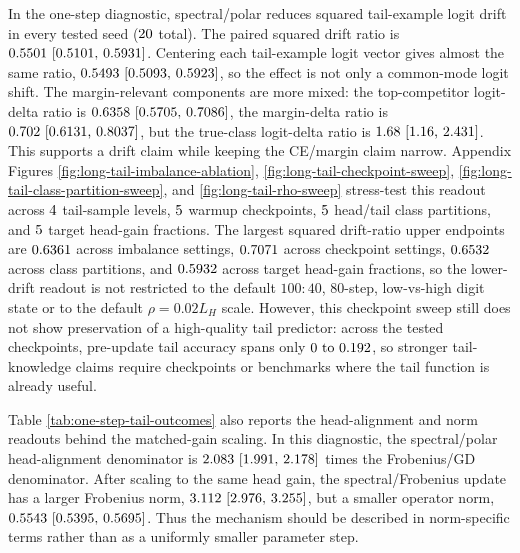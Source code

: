 \documentclass{article}
\theoremstyle{definition}
\begin{document}
In the one-step diagnostic, spectral/polar reduces squared tail-example logit drift in every tested seed (\(20\) total). The paired squared drift ratio is \(0.5501 ~\text{[0.5101,\hspace{0.35em}0.5931]}\). Centering each tail-example logit vector gives almost the same ratio, \(0.5493 ~\text{[0.5093,\hspace{0.35em}0.5923]}\), so the effect is not only a common-mode logit shift. The margin-relevant components are more mixed: the top-competitor logit-delta ratio is \(0.6358 ~\text{[0.5705,\hspace{0.35em}0.7086]}\), the margin-delta ratio is \(0.702 ~\text{[0.6131,\hspace{0.35em}0.8037]}\), but the true-class logit-delta ratio is \(1.68 ~\text{[1.16,\hspace{0.35em}2.431]}\). This supports a drift claim while keeping the CE/margin claim narrow. Appendix Figures \ref{fig:long-tail-imbalance-ablation}, \ref{fig:long-tail-checkpoint-sweep}, \ref{fig:long-tail-class-partition-sweep}, and \ref{fig:long-tail-rho-sweep} stress-test this readout across \(4\) tail-sample levels, \(5\) warmup checkpoints, \(5\) head/tail class partitions, and \(5\) target head-gain fractions. The largest squared drift-ratio upper endpoints are \(0.6361\) across imbalance settings, \(0.7071\) across checkpoint settings, \(0.6532\) across class partitions, and \(0.5932\) across target head-gain fractions, so the lower-drift readout is not restricted to the default \(100{:}40\), 80-step, low-vs-high digit state or to the default \(\rho=0.02L_H\) scale. However, this checkpoint sweep still does not show preservation of a high-quality tail predictor: across the tested checkpoints, pre-update tail accuracy spans only \(0\text{ to }0.192\), so stronger tail-knowledge claims require checkpoints or benchmarks where the tail function is already useful.

Table \ref{tab:one-step-tail-outcomes} also reports the head-alignment and norm readouts behind the matched-gain scaling. In this diagnostic, the spectral/polar head-alignment denominator is \(2.083 ~\text{[1.991,\hspace{0.35em}2.178]}\) times the Frobenius/GD denominator. After scaling to the same head gain, the spectral/Frobenius update has a larger Frobenius norm, \(3.112 ~\text{[2.976,\hspace{0.35em}3.255]}\), but a smaller operator norm, \(0.5543 ~\text{[0.5395,\hspace{0.35em}0.5695]}\). Thus the mechanism should be described in norm-specific terms rather than as a uniformly smaller parameter step.
\end{document}
